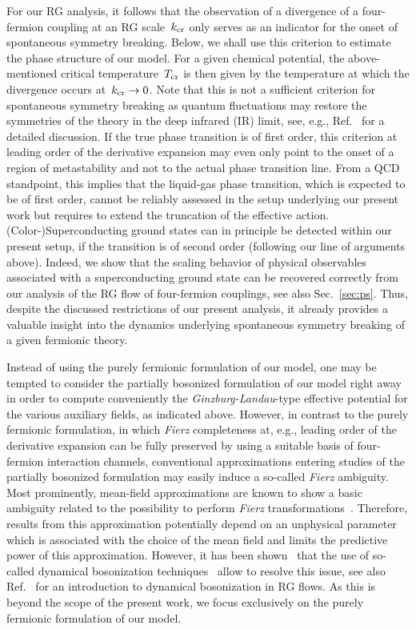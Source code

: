 \documentclass[prd,english,preprintnumbers,amsmath,amssymb,nofootinbib,twocolumn,superscriptaddress]{revtex4-1}
\begin{document}
{For our RG analysis, it follows that the
observation of a divergence of a four-fermion coupling {at an RG} scale~$k_{\rm cr}$ 
only serves as an indicator for the onset of spontaneous symmetry breaking. Below, we shall use this criterion 
to estimate the phase structure of our model. For a given chemical potential, the above-mentioned critical temperature~$T_{\rm cr}$ is then
given by the temperature at which the divergence occurs at~$k_{\rm cr}\to 0$.
Note that this is not a sufficient criterion for spontaneous {symmetry breaking 
as quantum fluctuations may restore the symmetries
of the theory in the deep infrared (IR) limit, see, e.g., Ref.~\cite{Braun:2011pp} for a detailed discussion.
If the true phase transition is of first order, this criterion at leading order of the derivative expansion may even only point
to the onset of a region of metastability and not to the actual phase transition line.} 
{From a QCD standpoint, this implies that the liquid-gas phase transition, which is expected to be of first order, 
cannot be reliably assessed in the setup underlying our present work but requires to extend the truncation of the effective action.
(Color-)Superconducting ground states can in principle be detected within our present setup, 
if the transition is of second order (following our line of arguments above). Indeed, we show that the scaling behavior of physical
observables associated with a superconducting ground state can be recovered correctly from our analysis of the RG flow
of four-fermion couplings, see also Sec.~\ref{sec:ps}.
Thus, despite the discussed restrictions of our present analysis, it}
already {provides a valuable insight} into the dynamics underlying spontaneous symmetry breaking of a given fermionic theory. 

Instead of using the purely fermionic formulation of our model, one may be tempted to consider the partially bosonized formulation of our 
model right away in order to compute conveniently the {\it Ginzburg-Landau}-type effective potential for the various auxiliary fields, as
indicated above.
However, in contrast to the purely fermionic formulation, in which {\it Fierz} completeness at, e.g., leading order of the derivative expansion 
can be fully preserved
by using a suitable basis of four-fermion interaction channels, 
conventional approximations entering studies of the
partially bosonized formulation may {easily induce a so-called {\it Fierz} ambiguity}. Most prominently, mean-field approximations
are known to show a basic ambiguity related to the possibility to perform {\it Fierz} 
transformations~\cite{Jaeckel:2002rm}. {Therefore, results} from this approximation potentially depend 
on an unphysical parameter which is associated with 
the choice of the mean field and limits the predictive power of this approximation.
However, it has been shown~\cite{Jaeckel:2002rm} that the {use of so-called 
dynamical bosonization techniques~\cite{Gies:2001nw,Gies:2002hq,Pawlowski:2005xe,Braun:2008pi,Floerchinger:2009uf, %
Floerchinger:2010da,Braun:2014ata,Mitter:2014wpa} allow to}
resolve this issue,
see also Ref.~\cite{Gies:2006wv} for an introduction to dynamical bosonization in RG flows.
As this is beyond the scope of the present work, we focus exclusively on the purely fermionic formulation of our model.

}
\end{document}
